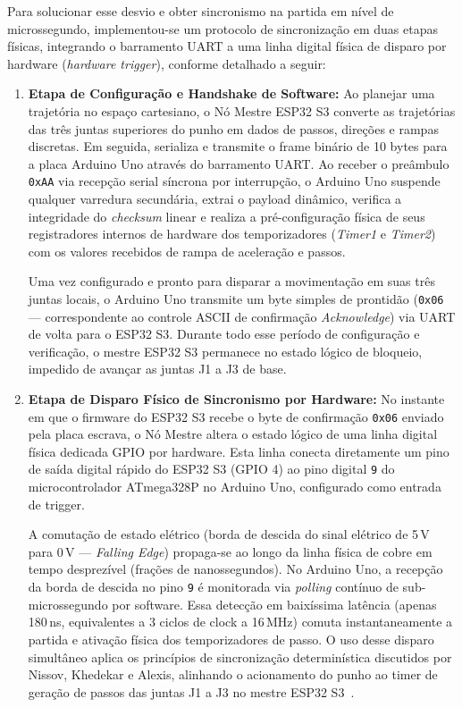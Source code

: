 Para solucionar esse desvio e obter sincronismo na partida em nível de microssegundo, implementou-se um protocolo de sincronização em duas etapas físicas, integrando o barramento UART a uma linha digital física de disparo por hardware (\textit{hardware trigger}), conforme detalhado a seguir:
\begin{enumerate}
    \item \textbf{Etapa de Configuração e Handshake de Software:}
    Ao planejar uma trajetória no espaço cartesiano, o Nó Mestre ESP32 S3 converte as trajetórias das três juntas superiores do punho em dados de passos, direções e rampas discretas. Em seguida, serializa e transmite o frame binário de 10 bytes para a placa Arduino Uno através do barramento UART. Ao receber o preâmbulo \texttt{0xAA} via recepção serial síncrona por interrupção, o Arduino Uno suspende qualquer varredura secundária, extrai o payload dinâmico, verifica a integridade do \textit{checksum} linear e realiza a pré-configuração física de seus registradores internos de hardware dos temporizadores (\textit{Timer1} e \textit{Timer2}) com os valores recebidos de rampa de aceleração e passos.
    
    Uma vez configurado e pronto para disparar a movimentação em suas três juntas locais, o Arduino Uno transmite um byte simples de prontidão (\texttt{0x06} --- correspondente ao controle ASCII de confirmação \textit{Acknowledge}) via UART de volta para o ESP32 S3. Durante todo esse período de configuração e verificação, o mestre ESP32 S3 permanece no estado lógico de bloqueio, impedido de avançar as juntas J1 a J3 de base.
    
    \item \textbf{Etapa de Disparo Físico de Sincronismo por Hardware:}
    No instante em que o firmware do ESP32 S3 recebe o byte de confirmação \texttt{0x06} enviado pela placa escrava, o Nó Mestre altera o estado lógico de uma linha digital física dedicada GPIO por hardware. Esta linha conecta diretamente um pino de saída digital rápido do ESP32 S3 (GPIO 4) ao pino digital \texttt{9} do microcontrolador ATmega328P no Arduino Uno, configurado como entrada de trigger.
    
    A comutação de estado elétrico (borda de descida do sinal elétrico de 5\,V para 0\,V --- \textit{Falling Edge}) propaga-se ao longo da linha física de cobre em tempo desprezível (frações de nanossegundos). No Arduino Uno, a recepção da borda de descida no pino \texttt{9} é monitorada via \textit{polling} contínuo de sub-microssegundo por software. Essa detecção em baixíssima latência (apenas 180\,ns, equivalentes a 3 ciclos de clock a 16\,MHz) comuta instantaneamente a partida e ativação física dos temporizadores de passo. O uso desse disparo simultâneo aplica os princípios de sincronização determinística discutidos por Nissov, Khedekar e Alexis, alinhando o acionamento do punho ao timer de geração de passos das juntas J1 a J3 no mestre ESP32 S3~\cite{nissov2025simultaneous}.
\end{enumerate}

